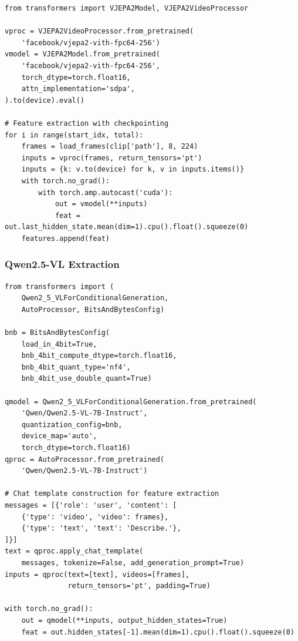 \begin{lstlisting}[caption={V-JEPA 2 feature extraction with checkpointing.}, label={lst:vjepa_extraction}]
from transformers import VJEPA2Model, VJEPA2VideoProcessor

vproc = VJEPA2VideoProcessor.from_pretrained(
    'facebook/vjepa2-vith-fpc64-256')
vmodel = VJEPA2Model.from_pretrained(
    'facebook/vjepa2-vith-fpc64-256',
    torch_dtype=torch.float16,
    attn_implementation='sdpa',
).to(device).eval()

# Feature extraction with checkpointing
for i in range(start_idx, total):
    frames = load_frames(clip['path'], 8, 224)
    inputs = vproc(frames, return_tensors='pt')
    inputs = {k: v.to(device) for k, v in inputs.items()}
    with torch.no_grad():
        with torch.amp.autocast('cuda'):
            out = vmodel(**inputs)
            feat = out.last_hidden_state.mean(dim=1).cpu().float().squeeze(0)
    features.append(feat)
\end{lstlisting}

\subsubsection{Qwen2.5-VL Extraction}

\begin{lstlisting}[caption={Qwen2.5-VL 4-bit quantized feature extraction.}, label={lst:qwen_extraction}]
from transformers import (
    Qwen2_5_VLForConditionalGeneration,
    AutoProcessor, BitsAndBytesConfig)

bnb = BitsAndBytesConfig(
    load_in_4bit=True,
    bnb_4bit_compute_dtype=torch.float16,
    bnb_4bit_quant_type='nf4',
    bnb_4bit_use_double_quant=True)

qmodel = Qwen2_5_VLForConditionalGeneration.from_pretrained(
    'Qwen/Qwen2.5-VL-7B-Instruct',
    quantization_config=bnb,
    device_map='auto',
    torch_dtype=torch.float16)
qproc = AutoProcessor.from_pretrained(
    'Qwen/Qwen2.5-VL-7B-Instruct')

# Chat template construction for feature extraction
messages = [{'role': 'user', 'content': [
    {'type': 'video', 'video': frames},
    {'type': 'text', 'text': 'Describe.'},
]}]
text = qproc.apply_chat_template(
    messages, tokenize=False, add_generation_prompt=True)
inputs = qproc(text=[text], videos=[frames],
               return_tensors='pt', padding=True)

with torch.no_grad():
    out = qmodel(**inputs, output_hidden_states=True)
    feat = out.hidden_states[-1].mean(dim=1).cpu().float().squeeze(0)
\end{lstlisting}

